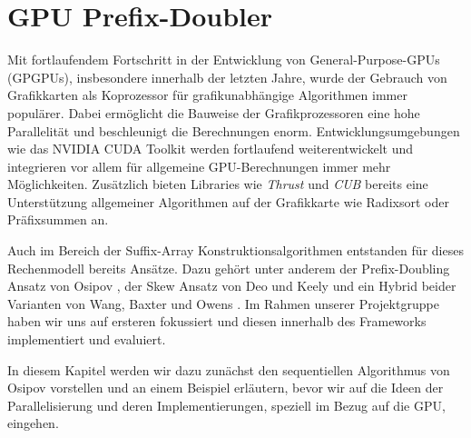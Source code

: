 \section{GPU Prefix-Doubler}
\label{algorithm:gpuprefix}
Mit  fortlaufendem Fortschritt in der Entwicklung von General-Purpose-GPUs (GPGPUs), insbesondere innerhalb der letzten Jahre, wurde der Gebrauch von Grafikkarten als Koprozessor für grafikunabhängige Algorithmen immer populärer. Dabei ermöglicht die Bauweise der Grafikprozessoren eine hohe Parallelität und beschleunigt die Berechnungen enorm. Entwicklungsumgebungen wie das NVIDIA CUDA Toolkit werden fortlaufend weiterentwickelt und integrieren vor allem für allgemeine GPU-Berechnungen immer mehr Möglichkeiten. Zusätzlich bieten Libraries wie \textit{Thrust} und \textit{CUB} bereits eine Unterstützung allgemeiner Algorithmen auf der Grafikkarte wie Radixsort oder Präfixsummen an.

Auch im Bereich der Suffix-Array Konstruktionsalgorithmen entstanden für dieses Rechenmodell bereits Ansätze. Dazu gehört unter anderem der Prefix-Doubling Ansatz von Osipov \cite{osipovGPU}, der Skew Ansatz von Deo und Keely \cite{deoGPU} und ein Hybrid beider Varianten von Wang, Baxter und Owens \cite{wangGPU}. Im Rahmen unserer Projektgruppe haben wir uns auf ersteren fokussiert und diesen innerhalb des Frameworks implementiert und evaluiert.

In diesem Kapitel werden wir dazu zunächst den sequentiellen Algorithmus von Osipov vorstellen und an einem Beispiel erläutern, bevor wir auf die Ideen der Parallelisierung und deren Implementierungen, speziell im Bezug auf die GPU, eingehen.

